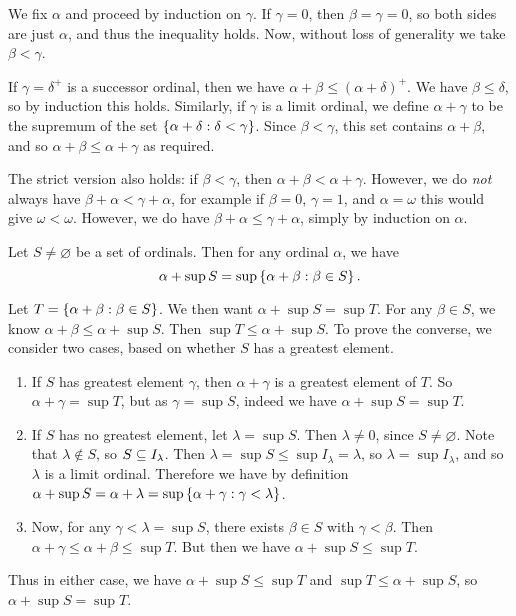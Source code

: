 \documentclass{article}
\begin{document}
\begin{prf}
    We fix $\alpha$ and proceed by induction on $\gamma$. If $\gamma = 0$, then $\beta = \gamma = 0$, so both sides are just $\alpha$, and thus the inequality holds. Now, without loss of generality we take $\beta < \gamma$.
    
    If $\gamma = \delta^+$ is a successor ordinal, then we have $\alpha + \beta \leq (\alpha + \delta)^+$. We have $\beta \leq \delta$, so by induction this holds. Similarly, if $\gamma$ is a limit ordinal, we define $\alpha + \gamma$ to be the supremum of the set $\left\lbrace \alpha + \delta : \delta < \gamma \right\rbrace$. Since $\beta < \gamma$, this set contains $\alpha + \beta$, and so $\alpha + \beta \leq \alpha + \gamma$ as required.
\end{prf}

\begin{corollary}
	The strict version also holds: if $\beta < \gamma$, then $\alpha + \beta < \alpha + \gamma$. However, we do \textit{not} always have $\beta + \alpha < \gamma + \alpha$, for example if $\beta = 0$, $\gamma = 1$, and $\alpha = \omega$ this would give $\omega < \omega$. However, we do have $\beta + \alpha \leq \gamma + \alpha$, simply by induction on $\alpha$.
\end{corollary}

\begin{proposition}
    Let $S \neq \varnothing$ be a set of ordinals. Then for any ordinal $\alpha$, we have
    \[
	\alpha + \sup S = \sup \left\lbrace \alpha + \beta : \beta \in S \right\rbrace.
	\]
\end{proposition}

\begin{prf}
	Let $T = \left\lbrace \alpha + \beta : \beta \in S \right\rbrace$. We then want $\alpha + \sup S = \sup T$. For any $\beta \in S$, we know $\alpha + \beta \leq \alpha + \sup S$. Then $\sup T \leq \alpha + \sup S$. To prove the converse, we consider two cases, based on whether $S$ has a greatest element.
	\begin{enumerate}
    	\item If $S$ has greatest element $\gamma$, then $\alpha + \gamma$ is a greatest element of $T$. So $\alpha + \gamma = \sup T$, but as $\gamma = \sup S$, indeed we have $\alpha + \sup S = \sup T$.
    	\item If $S$ has no greatest element, let $\lambda = \sup S$. Then $\lambda \neq 0$, since $S \neq \varnothing$. Note that $\lambda \notin S$, so $S \subseteq I_\lambda$. Then $\lambda = \sup S \leq \sup I_\lambda = \lambda$, so $\lambda = \sup I_\lambda$, and so $\lambda$ is a limit ordinal. Therefore we have by definition $\alpha + \sup S = \alpha + \lambda = \sup \left\lbrace \alpha + \gamma : \gamma < \lambda \right\rbrace$.
    	\item[] Now, for any $\gamma < \lambda = \sup S$, there exists $\beta \in S$ with $\gamma < \beta$. Then $\alpha + \gamma \leq \alpha + \beta \leq \sup T$. But then we have $\alpha + \sup S \leq \sup T$.
	\end{enumerate}
	Thus in either case, we have $\alpha + \sup S \leq \sup T$ and $\sup T \leq \alpha + \sup S$, so $\alpha + \sup S = \sup T$.
\end{prf}
\end{document}
